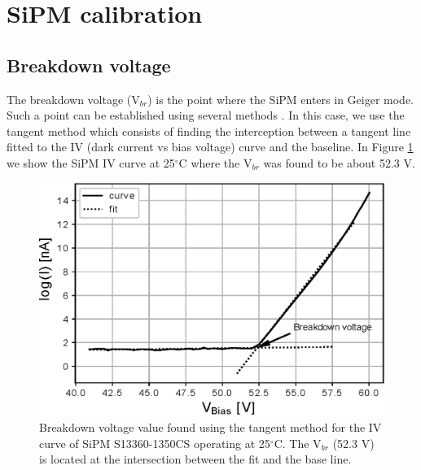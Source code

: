 \documentclass[a4paper,11pt]{article}
\begin{document}


\section{SiPM calibration}
\label{sec:res}

\subsection{Breakdown voltage}
The breakdown voltage (V$_{br}$) is the point where the SiPM enters in Geiger mode. Such a point can be established using several methods \cite{Nagy2017}. In this case, we use the tangent method which consists of finding the interception between a tangent line fitted to the IV (dark current vs bias voltage) curve and the baseline. In Figure \ref{fig:Vbr} we show the SiPM IV curve at 25$^{\circ}$C where the V$_{br}$ was found to be about 52.3 V.

\begin{figure}[htbp]
\centering %
\includegraphics[width=.55\textwidth]{Figures/cal_voltaje_ruptura.eps}
\caption{Breakdown voltage value found using the tangent method for the IV curve of SiPM S13360-1350CS operating at 25$^{\circ}$C. The V$_{br}$ (52.3 V) is located at the intersection between the fit and the base line.}
\label{fig:Vbr} 
\end{figure}
\end{document}

